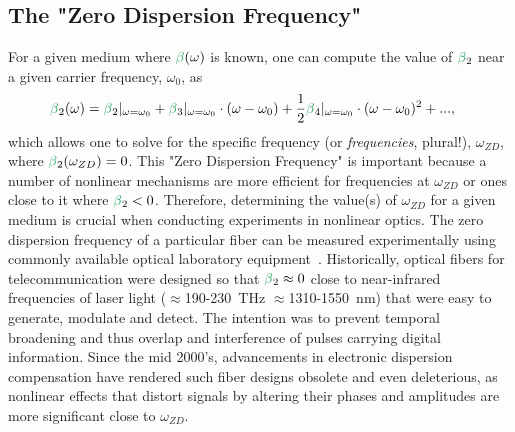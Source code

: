 \subsection{The "Zero Dispersion Frequency"}
\label{subsec:ZDF}
For a given medium where $\betag(\omega)$ is known, one can compute the value of $\betag_2$ near a given carrier frequency, $\omega_0$, as
\begin{align}
\label{eq:ZDF}
    \betag_2(\omega) &= \betag_2|_{\omega=\omega_0} + \betag_3|_{\omega=\omega_0}\cdot(\omega-\omega_0)+\frac{1}{2}\betag_4|_{\omega=\omega_0}\cdot(\omega-\omega_0)^2 +...,
\end{align}
which allows one to solve for the specific frequency (or \emph{frequencies}, plural!), $\omega_{ZD}$, where $\betag_2(\omega_{ZD})=0$. This "Zero Dispersion Frequency" is important because a number of nonlinear mechanisms are more efficient for frequencies at $\omega_{ZD}$ or ones close to it where $\betag_2<0$. Therefore, determining the value(s) of $\omega_{ZD}$ for a given medium is crucial when conducting experiments in nonlinear optics. The zero dispersion frequency of a particular fiber can be measured experimentally using commonly available optical laboratory equipment~\cite{zero_disp_measurement}.
Historically, optical fibers for telecommunication were designed so that $\betag_2\approx0$ close to near-infrared frequencies of laser light ($\approx$190-230~THz $\approx$1310-1550~nm) that were easy to generate, modulate and detect. The intention was to prevent temporal broadening and thus overlap and interference of pulses carrying digital information. Since the mid 2000's, advancements in electronic dispersion compensation have rendered such fiber designs obsolete and even deleterious, as nonlinear effects that distort signals by altering their phases and amplitudes are more significant close to $\omega_{ZD}$.


